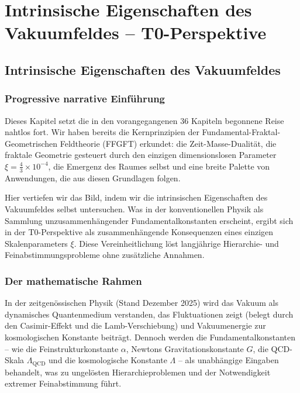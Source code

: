 \chapter{Intrinsische Eigenschaften des Vakuumfeldes – T0-Perspektive}


\section{Intrinsische Eigenschaften des Vakuumfeldes}
	
	
	\subsection*{Progressive narrative Einführung}
	
	Dieses Kapitel setzt die in den vorangegangenen 36 Kapiteln begonnene Reise nahtlos fort. Wir haben bereits die Kernprinzipien der Fundamental-Fraktal-Geometrischen Feldtheorie (FFGFT) erkundet: die Zeit-Masse-Dualität, die fraktale Geometrie gesteuert durch den einzigen dimensionslosen Parameter \(\xi = \frac{4}{3} \times 10^{-4}\), die Emergenz des Raumes selbst und eine breite Palette von Anwendungen, die aus diesen Grundlagen folgen.
	
	Hier vertiefen wir das Bild, indem wir die intrinsischen Eigenschaften des Vakuumfeldes selbst untersuchen. Was in der konventionellen Physik als Sammlung unzusammenhängender Fundamentalkonstanten erscheint, ergibt sich in der T0-Perspektive als zusammenhängende Konsequenzen eines einzigen Skalenparameters \(\xi\). Diese Vereinheitlichung löst langjährige Hierarchie- und Feinabstimmungsprobleme ohne zusätzliche Annahmen.
	
	\subsection*{Der mathematische Rahmen}
	
	In der zeitgenössischen Physik (Stand Dezember 2025) wird das Vakuum als dynamisches Quantenmedium verstanden, das Fluktuationen zeigt (belegt durch den Casimir-Effekt und die Lamb-Verschiebung) und Vakuumenergie zur kosmologischen Konstante beiträgt. Dennoch werden die Fundamentalkonstanten – wie die Feinstrukturkonstante \(\alpha\), Newtons Gravitationskonstante \(G\), die QCD-Skala \(\Lambda_{\text{QCD}}\) und die kosmologische Konstante \(\Lambda\) – als unabhängige Eingaben behandelt, was zu ungelösten Hierarchieproblemen und der Notwendigkeit extremer Feinabstimmung führt.
	
